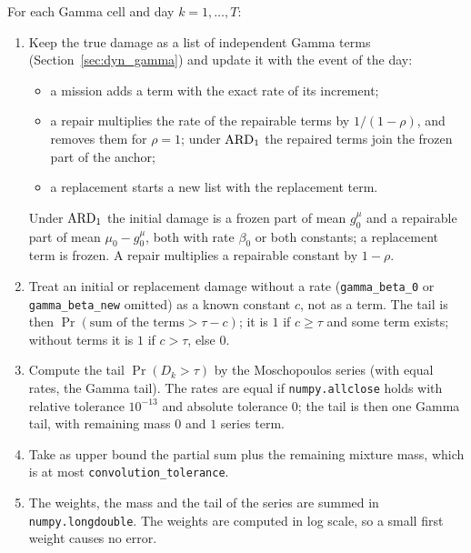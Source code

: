 For each Gamma cell and day $k = 1,\ldots,T$:
\begin{enumerate}[nosep,label=\arabic*.]
  \item Keep the true damage as a list of independent Gamma terms (Section~\ref{sec:dyn_gamma}) and update it with the event of the day:
  \begin{itemize}[nosep]
    \item a mission adds a term with the exact rate of its increment;
    \item a repair multiplies the rate of the repairable terms by $1/(1-\rho)$, and removes them for $\rho = 1$; under $\mathrm{ARD}_{1}$ the repaired terms join the frozen part of the anchor;
    \item a replacement starts a new list with the replacement term.
  \end{itemize}
  Under $\mathrm{ARD}_{1}$ the initial damage is a frozen part of mean $g^{\mu}_0$ and a repairable part of mean $\mu_0 - g^{\mu}_0$, both with rate $\beta_0$ or both constants; a replacement term is frozen. A repair multiplies a repairable constant by $1 - \rho$.
  \item Treat an initial or replacement damage without a rate (\texttt{gamma\_beta\_0} or \texttt{gamma\_beta\_new} omitted) as a known constant $c$, not as a term. The tail is then $\Pr(\text{sum of the terms} > \tau - c)$; it is $1$ if $c \ge \tau$ and some term exists; without terms it is $1$ if $c > \tau$, else $0$.
  \item Compute the tail $\Pr(D_k > \tau)$ by the Moschopoulos series (with equal rates, the Gamma tail). The rates are equal if \texttt{numpy.allclose} holds with relative tolerance $10^{-13}$ and absolute tolerance $0$; the tail is then one Gamma tail, with remaining mass $0$ and $1$ series term.
  \item Take as upper bound the partial sum plus the remaining mixture mass, which is at most \texttt{convolution\_tolerance}.
  \item The weights, the mass and the tail of the series are summed in \texttt{numpy.longdouble}. The weights are computed in log scale, so a small first weight causes no error.
\end{enumerate}

